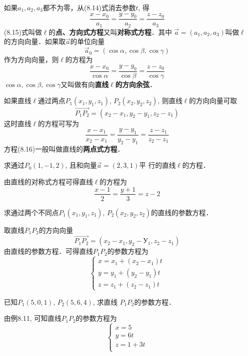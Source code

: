 如果$a_1,a_2,a_3$都不为零，从(8.14)式消去参数$t$, 得
\[\frac{x-x_0}{a_1}=\frac{y-y_0}{a_2}=\frac{z-z_0}{a_3}\]
(8.15)式叫做$\ell$的\textbf{点、方向式方程}又叫\textbf{对称式方程}．其中
$\vec{a}=(a_1,a_2,a_3)$叫做$\ell$的方向向量．如果取$\vec{a}$的单位向量
\[\vec{a}_0=(\cos\alpha, \cos\beta,\cos\gamma)\]
作为方向向量，则$\ell$的方程为
\[\frac{x-x_0}{\cos\alpha}=\frac{y-y_0}{\cos\beta}=\frac{z-z_0}{\cos\gamma}\]
$\cos\alpha, \cos\beta,\cos\gamma$又叫做有向\textbf{直线$\ell$的方向余弦}．

如果直线$\ell$通过两点$P_1(x_1,y_1,z_1)$, $P_2(x_2,y_2,z_2)$, 
则直线$\ell$的方向向量可取
\[\Vec{P_1P_2}=(x_2-x_1,y_2-y_1,z_2-z_1)\]
这时直线$\ell$的方程可写为
\begin{equation}
    \frac{x-x_1}{x_2-x_1}=\frac{y-y_1}{y_2-y_1}=\frac{z-z_1}{z_2-z_1}
\end{equation}
方程(8.16)一般叫做直线的\textbf{两点式方程}．



\begin{example}
    求通过$P_0(1,-1,2)$, 且和向量$\vec{a}=(2,3,1)$平
行的直线$\ell$的方程．
\end{example}


\begin{solution}
    由直线的对称式方程可得直线$\ell$的方程为
\[\frac{x-1}{2}=\frac{y+1}{3}=z-2\]
\end{solution}

\begin{example}
    求通过两个不同点$P_1(x_1,y_1,z_1)$, $P_2(x_2,
y_2,z_2)$的直线的参数方程．
\end{example}


\begin{solution}
    取直线$P_1P_2$的方向向量
\[    \Vec{P_1P_2}=(x_2-x_1, y_2-У_1,z_2-z_1)\]
    由直线的参数方程．可得直线$P_1P_2$的参数方程为
\[\begin{cases}
    x=x_1+(x_2-x_1)t\\
    y=y_1+(y_2-y_1)t\\
    z=z_1+(z_2-z_1)t
\end{cases}\]
\end{solution}    

\begin{example}
    已知$P_1(5,0,1)$, $P_2(5,6,4)$, 求直线
$P_1P_2$的参数方程．
\end{example}


\begin{solution}
    由例8.11, 可知直线$P_1P_2$的参数方程为
    \[\begin{cases}
     x=5\\
y=6t\\
z=1+3t\\
    \end{cases}\]
\end{solution}

